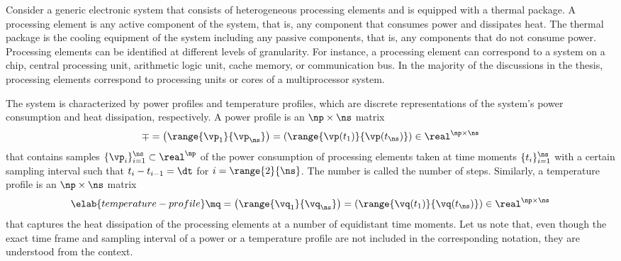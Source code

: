 Consider a generic electronic system that consists of \np heterogeneous
processing elements and is equipped with a thermal package. A processing element
is any active component of the system, that is, any component that consumes
power and dissipates heat. The thermal package is the cooling equipment of the
system including any passive components, that is, any components that do not
consume power. Processing elements can be identified at different levels of
granularity. For instance, a processing element can correspond to a system on a
chip, central processing unit, arithmetic logic unit, cache memory, or
communication bus. In the majority of the discussions in the thesis, processing
elements correspond to processing units or cores of a multiprocessor system.

The system is characterized by power profiles and temperature profiles, which
are discrete representations of the system's power consumption and heat
dissipation, respectively. A power profile is an $\np \times \ns$ matrix
\[
  \mp
  = \left(\range{\vp_1}{\vp_\ns}\right)
  = \left(\range{\vp(t_1)}{\vp(t_\ns)}\right) \in \real^{\np \times \ns}
\]
that contains \ns samples $\{ \vp_i \}_{i = 1}^\ns \subset \real^\np$ of the
power consumption of \np processing elements taken at \ns time moments $\{ t_i
\}_{i = 1}^\ns$ with a certain sampling interval \dt such that $t_i - t_{i - 1}
= \dt$ for $i = \range{2}{\ns}$. The number \ns is called the number of steps.
Similarly, a temperature profile is an $\np \times \ns$ matrix
\begin{equation} \elab{temperature-profile}
  \mq
  = \left(\range{\vq_1}{\vq_\ns}\right)
  = \left(\range{\vq(t_1)}{\vq(t_\ns)}\right) \in \real^{\np \times \ns}
\end{equation}
that captures the heat dissipation of the processing elements at a number of
equidistant time moments. Let us note that, even though the exact time frame and
sampling interval of a power or a temperature profile are not included in the
corresponding notation, they are understood from the context.
